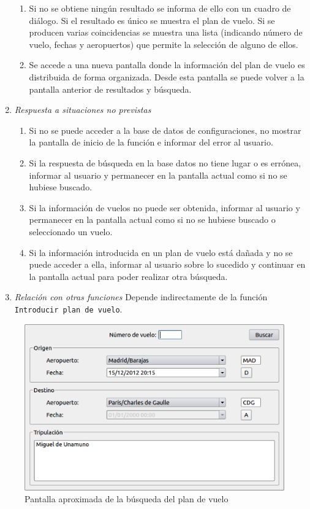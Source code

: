 \begin{enumerate}
\begin{enumerate}
			\item Si no se obtiene ningún resultado se informa de ello con un cuadro de diálogo. Si el resultado es único se muestra el plan de vuelo. Si se producen varias coincidencias se muestra una lista (indicando número de vuelo, fechas y aeropuertos) que permite la selección de alguno de ellos.
			\item Se accede a una nueva pantalla donde la información del plan de vuelo es distribuida de forma organizada. Desde esta pantalla se puede volver a la pantalla anterior de resultados y búsqueda.
		\end{enumerate}
		\item \textit{Respuesta a situaciones no previstas}
		\begin{enumerate}
			\item Si no se puede acceder a la base de datos de configuraciones, no mostrar la pantalla de inicio de la función e informar del error al usuario.
			\item Si la respuesta de búsqueda en la base datos no tiene lugar o es errónea, informar al usuario y permanecer en la pantalla actual como si no se hubiese buscado.
			\item Si la información de vuelos no puede ser obtenida, informar al usuario y permanecer en la pantalla actual como si no se hubiese buscado o seleccionado un vuelo.
			\item Si la información introducida en un plan de vuelo está dañada y no se puede acceder a ella, informar al usuario sobre lo sucedido y continuar en la pantalla actual para poder realizar otra búsqueda.
		\end{enumerate}
		\item \textit{Relación con otras funciones}
			Depende indirectamente de la función \verb|Introducir plan de vuelo|.
	\end{enumerate}

\begin{figure}[ht]\centering
\includegraphics[scale=.6]{imagenes/BuscarPlanVuelo.png}
\caption{Pantalla aproximada de la búsqueda del plan de vuelo}
\end{figure}